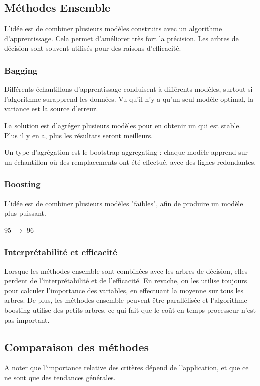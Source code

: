 \subsection{Méthodes Ensemble}

L'idée est de combiner plusieurs modèles construits avec un algorithme d'apprentissage. Cela permet d'améliorer très fort la précision. Les arbres de décision sont souvent utilisés pour des raisons d'efficacité.

	\subsubsection{Bagging}
	
	Différents échantillons d'apprentissage conduisent à différents modèles, surtout si l'algorithme surapprend les données. Vu qu'il n'y a qu'un seul modèle optimal, la variance est la source d'erreur.
	
	La solution est d'agréger plusieurs modèles pour en obtenir un qui est stable. Plus il y en a, plus les résultats seront meilleurs.
	
	
	Un type d'agrégation est le bootstrap aggregating : chaque modèle apprend sur un échantillon où des remplacements ont été effectué, avec des lignes redondantes.
	
	
	
	\subsubsection{Boosting}
	
	L'idée est de combiner plusieurs modèles "faibles", afin de produire un modèle plus puissant.
	
	95 $\rightarrow$ 96
	
	\subsubsection{Interprétabilité et efficacité}
	
	Lorsque les méthodes ensemble sont combinées avec les arbres de décision, elles perdent de l'interprétabilité et de l'efficacité. En revache, on les utilise toujours pour calculer l'importance des variables, en effectuant la moyenne sur tous les arbres. De plus, les méthodes ensemble peuvent être parallélisée et l'algorithme boosting utilise des petits arbres, ce qui fait que le coût en temps processeur n'est pas important.
	
	\subsection{Comparaison des méthodes}
	

	A noter que l'importance relative des critères dépend de l'application, et que ce ne sont que des tendances générales.
	
